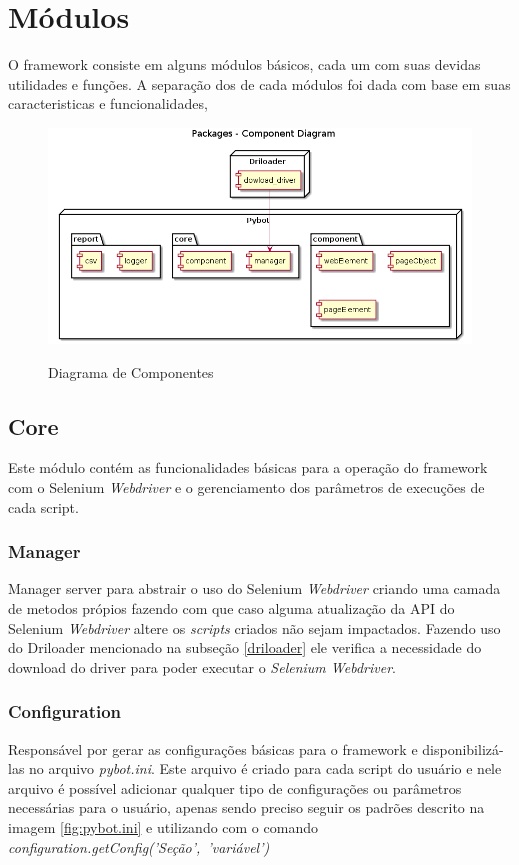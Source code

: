 %
%
\chapter{Módulos}\label{chap:imp}
    O framework consiste em alguns módulos básicos, cada um com suas devidas utilidades e funções.
    A separação dos de cada módulos foi dada com base em suas caracteristicas e funcionalidades,

    \begin{figure}[H]
        \vspace*{0,3cm}
        \centering
        \caption{Diagrama de Componentes}
        \includegraphics[width=1\textwidth]{./04-figuras/model}
        \label{fig:modules}
    \end{figure}

    \section{Core}
        Este módulo contém as funcionalidades básicas para a operação do framework com o Selenium \emph{Webdriver}
        e o gerenciamento dos parâmetros de execuções de cada script.

        \subsection{Manager}
        Manager server para abstrair o uso do Selenium \emph{Webdriver} criando uma camada de metodos própios fazendo com que caso alguma
        atualização da API do Selenium \emph{Webdriver} altere os \emph{scripts} criados não sejam impactados. Fazendo uso do Driloader mencionado na
        subseção \ref{driloader} ele verifica a necessidade do download do driver para poder executar o \emph{Selenium Webdriver}.

        \subsection{Configuration}
        Responsável por gerar as configurações básicas para o framework e disponibilizá-las no arquivo \emph{pybot.ini}.
        Este arquivo é criado para cada script do usuário e nele arquivo é possível adicionar qualquer tipo de configurações ou parâmetros
        necessárias para o usuário, apenas sendo preciso seguir os padrões descrito na imagem \ref{fig:pybot.ini} e utilizando com o comando
        \mbox{\emph{configuration.getConfig('Seção', 'variável')}}

